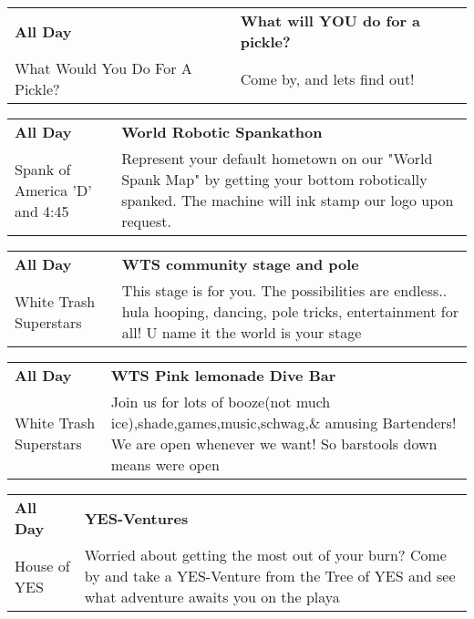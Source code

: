 \begin{tabular}{ p{1in} p{2.2in} }
    \textbf{All Day} & \textbf{What will YOU do for a pickle?} \\
    What Would You Do For A Pickle? \newline  & Come by, and lets find out! \\
    \hline 
\end{tabular}
    
\begin{tabular}{ p{1in} p{2.2in} }
    \textbf{All Day} & \textbf{World Robotic Spankathon} \\
    Spank of America \newline 'D' and 4:45 & Represent your default hometown on our "World Spank Map" by getting your bottom robotically spanked. The machine will ink stamp our logo upon request. \\
    \hline 
\end{tabular}
    
\begin{tabular}{ p{1in} p{2.2in} }
    \textbf{All Day} & \textbf{WTS community stage and pole} \\
    White Trash Superstars \newline  & This stage is for you. The possibilities are endless.. hula hooping,  dancing, pole tricks, entertainment for all! U name it the world is your stage \\
    \hline 
\end{tabular}
    
\begin{tabular}{ p{1in} p{2.2in} }
    \textbf{All Day} & \textbf{WTS Pink lemonade Dive Bar} \\
    White Trash Superstars \newline  & Join us for lots of booze(not much ice),shade,games,music,schwag,\& amusing Bartenders! We are open whenever we want! So barstools down means were open \\
    \hline 
\end{tabular}
    
\begin{tabular}{ p{1in} p{2.2in} }
    \textbf{All Day} & \textbf{YES-Ventures} \\
    House of YES \newline  & Worried about getting the most out of your burn? Come by and take a YES-Venture from the Tree of YES and see what adventure awaits you on the playa \\
    \hline 
\end{tabular}
    
